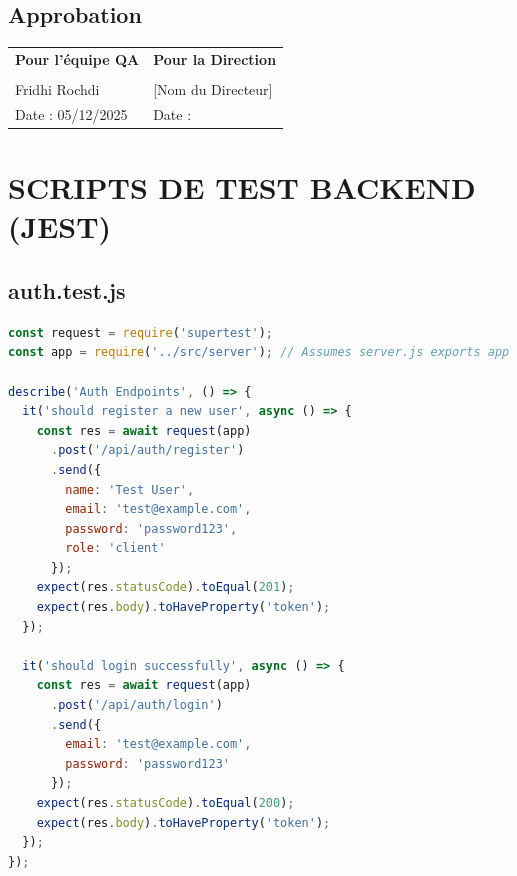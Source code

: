 \documentclass[12pt,a4paper]{article}
\begin{document}
\subsection{Approbation}
\vspace{2cm}
\begin{tabularx}{\textwidth}{|X|X|}
    \hline
    \textbf{Pour l'équipe QA} & \textbf{Pour la Direction} \\
    \vspace{3cm} & \vspace{3cm} \\
    Fridhi Rochdi & [Nom du Directeur] \\
    Date : 05/12/2025 & Date : \\ \hline
\end{tabularx}

\newpage

\appendix
\section{SCRIPTS DE TEST BACKEND (JEST)}

\subsection{auth.test.js}
\begin{lstlisting}[language=JavaScript]
const request = require('supertest');
const app = require('../src/server'); // Assumes server.js exports app

describe('Auth Endpoints', () => {
  it('should register a new user', async () => {
    const res = await request(app)
      .post('/api/auth/register')
      .send({
        name: 'Test User',
        email: 'test@example.com',
        password: 'password123',
        role: 'client'
      });
    expect(res.statusCode).toEqual(201);
    expect(res.body).toHaveProperty('token');
  });

  it('should login successfully', async () => {
    const res = await request(app)
      .post('/api/auth/login')
      .send({
        email: 'test@example.com',
        password: 'password123'
      });
    expect(res.statusCode).toEqual(200);
    expect(res.body).toHaveProperty('token');
  });
});
\end{lstlisting}

\newpage
\end{document}
